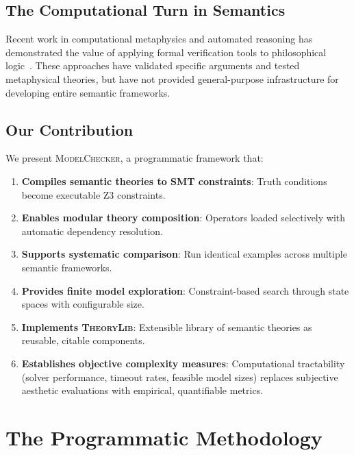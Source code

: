 \documentclass[pdflatex,sn-mathphys-num]{sn-jnl}
\newcommand{\theorylib}{\textsc{TheoryLib}}
\newcommand{\modelchecker}{\textsc{ModelChecker}}
\theoremstyle{thmstyleone}
\theoremstyle{thmstyletwo}
\theoremstyle{thmstylethree}
\begin{document}
\subsection{The Computational Turn in Semantics}\label{sec:computational-turn}

Recent work in computational metaphysics and automated reasoning has demonstrated the value of applying formal verification tools to philosophical logic~\cite{benzmuller2014,oppenheimer2011}.
These approaches have validated specific arguments and tested metaphysical theories, but have not provided general-purpose infrastructure for developing entire semantic frameworks.

\subsection{Our Contribution}\label{sec:contribution}

We present \modelchecker{}, a programmatic framework that:
\begin{enumerate}
    \item \textbf{Compiles semantic theories to SMT constraints}: Truth conditions become executable Z3 constraints.
    \item \textbf{Enables modular theory composition}: Operators loaded selectively with automatic dependency resolution.
    \item \textbf{Supports systematic comparison}: Run identical examples across multiple semantic frameworks.
    \item \textbf{Provides finite model exploration}: Constraint-based search through state spaces with configurable size.
    \item \textbf{Implements \theorylib{}}: Extensible library of semantic theories as reusable, citable components.
    \item \textbf{Establishes objective complexity measures}: Computational tractability (solver performance, timeout rates, feasible model sizes) replaces subjective aesthetic evaluations with empirical, quantifiable metrics.
\end{enumerate}


\section{The Programmatic Methodology}\label{sec:methodology}
\end{document}
